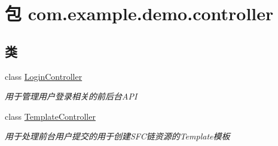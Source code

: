 \hypertarget{namespacecom_1_1example_1_1demo_1_1controller}{}\section{包 com.\+example.\+demo.\+controller}
\label{namespacecom_1_1example_1_1demo_1_1controller}
\subsection*{类}
\begin{DoxyCompactItemize}
\item 
class \mbox{\hyperlink{classcom_1_1example_1_1demo_1_1controller_1_1_login_controller}{Login\+Controller}}
\begin{DoxyCompactList}\small\item\em 用于管理用户登录相关的前后台\+A\+PI \end{DoxyCompactList}\item 
class \mbox{\hyperlink{classcom_1_1example_1_1demo_1_1controller_1_1_template_controller}{Template\+Controller}}
\begin{DoxyCompactList}\small\item\em 用于处理前台用户提交的用于创建\+S\+F\+C链资源的\+Template模板 \end{DoxyCompactList}\end{DoxyCompactItemize}
